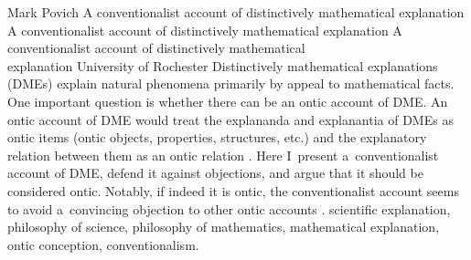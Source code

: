 \begin{artengenv}{Mark Povich}
	{A conventionalist account of distinctively mathematical explanation}
	{A conventionalist account of distinctively mathematical explanation}
	{A conventionalist account of distinctively mathematical\\explanation}
	{University of Rochester}
	{Distinctively mathematical explanations (DMEs) explain natural phenomena primarily by appeal to mathematical facts. One important question is whether there can be an ontic account of DME. An ontic account of DME would treat the explananda and explanantia of DMEs as ontic items (ontic objects, properties, structures, etc.) and the explanatory relation between them as an ontic relation
	\parencites[e.g.,][]{pincock_abstract_2015}[][]{povich_narrow_2021}.
	 Here I~present a~conventionalist account of DME, defend it against objections, and argue that it should be considered ontic. Notably, if indeed it is ontic, the conventionalist account seems to avoid a~convincing objection to other ontic accounts 
	\parencite[][]{kuorikoski_there_2021}.%
	}
	{scientific explanation, philosophy of science, philosophy of mathematics, mathematical explanation, ontic conception,
	conventionalism.}





\end{artengenv}
